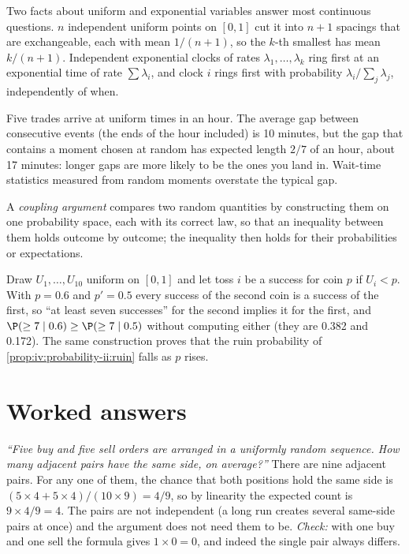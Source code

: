 Two facts about uniform and exponential variables answer most continuous questions. $n$ independent uniform
points on $[0,1]$ cut it into $n+1$ spacings that are exchangeable, each with mean $1/(n+1)$, so the $k$-th
smallest has mean $k/(n+1)$. Independent exponential clocks of rates $\lambda_1, \dots, \lambda_k$ ring first
at an exponential time of rate $\sum \lambda_i$, and clock $i$ rings first with probability $\lambda_i/\sum_j
\lambda_j$, independently of when.

\begin{example}\label{ex:iv:probability-ii:inspection}
Five trades arrive at uniform times in an hour. The average gap between consecutive events (the ends of the
hour included) is 10 minutes, but the gap that contains a moment chosen at random has expected length $2/7$ of
an hour, about 17 minutes: longer gaps are more likely to be the ones you land in. Wait-time statistics measured
from random moments overstate the typical gap.
\end{example}

\begin{definition}\label{def:iv:probability-ii:coupling}
A \emph{coupling argument} compares two random quantities by constructing them on
one probability space, each with its correct law, so that an inequality between them holds outcome by outcome;
the inequality then holds for their probabilities or expectations.
\end{definition}

\begin{example}\label{ex:iv:probability-ii:coupling}
Draw $U_1, \dots, U_{10}$ uniform on $[0,1]$ and let toss $i$ be a success for coin $p$ if $U_i < p$. With
$p = 0.6$ and $p' = 0.5$ every success of the second coin is a success of the first, so ``at least seven
successes'' for the second implies it for the first, and $\P(\ge 7 \mid 0.6) \ge \P(\ge 7 \mid 0.5)$ without
computing either (they are 0.382 and 0.172). The same construction proves that the ruin probability of
\cref{prop:iv:probability-ii:ruin} falls as $p$ rises.
\end{example}

\section{Worked answers}

\begin{example}\label{ex:iv:probability-ii:adjacent}
\emph{``Five buy and five sell orders are arranged in a uniformly random sequence. How many adjacent pairs have the same
side, on average?''} There are nine adjacent pairs. For any one of them, the chance that both positions hold the same
side is $(5 \times 4 + 5 \times 4)/(10 \times 9) = 4/9$, so by linearity the expected count is $9 \times 4/9 = 4$. The
pairs are not independent (a long run creates several same-side pairs at once) and the argument does not need them to
be. \emph{Check:} with one buy and one sell the formula gives $1 \times 0 = 0$, and indeed the single pair always differs.
\end{example}

